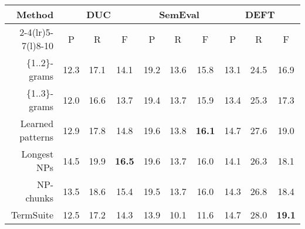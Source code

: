       \begin{table*}
        \centering
        \begin{tabular}{rccccccccc}
          \toprule
          \multirow{2}{*}[-2pt]{\textbf{Method}} & \multicolumn{3}{c}{\textbf{DUC}} & \multicolumn{3}{c}{\textbf{SemEval}} & \multicolumn{3}{c}{\textbf{DEFT}}\\
          \cmidrule(r){2-4}\cmidrule(lr){5-7}\cmidrule(l){8-10}
          & P & R & F & P & R & F & P & R & F\\
          \midrule
          \{1..2\}-grams & 12.3 & 17.1 & 14.1 & 19.2 & 13.6 & 15.8 & 13.1 & 24.5 & 16.9\\
          \{1..3\}-grams & 12.0 & 16.6 & 13.7 & 19.4 & 13.7 & 15.9 & 13.4 & 25.3 & 17.3\\
          Learned patterns & 12.9 & 17.8 & 14.8 & 19.6 & 13.8 & \textbf{16.1} & 14.7 & 27.6 & 19.0\\
          Longest NPs & 14.5 & 19.9 & \textbf{16.5} & 19.6 & 13.7 & 16.0 & 14.1 & 26.3 & 18.1\\
          NP-chunks & 13.5 & 18.6 & 15.4 & 19.5 & 13.7 & 16.0 & 14.3 & 26.8 & 18.4\\
          TermSuite & 12.5 & 17.2 & 14.3 & 13.9 & 10.1 & 11.6 & 14.7 & 28.0 & \textbf{19.1}\\
          \bottomrule
        \end{tabular}
        \caption{Comparison of candidate extraction methods, when extracting 10
                 keyphrases with \textbf{KEA}.
                 \label{tab:kea_results}}
      \end{table*}

